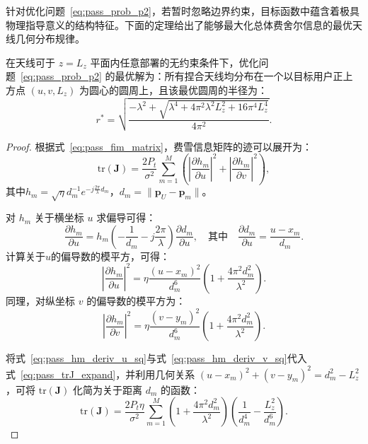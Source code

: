 针对优化问题~\eqref{eq:pass_prob_p2}，若暂时忽略边界约束，目标函数中蕴含着极具物理指导意义的结构特征。下面的定理给出了能够最大化总体费舍尔信息的最优天线几何分布规律。

\begin{theorem}\label{the:pass_optimal_geometry}
	在天线可于 $z = L_z$ 平面内任意部署的无约束条件下，优化问题~\eqref{eq:pass_prob_p2} 的最优解为：所有捏合天线均分布在一个以目标用户正上方点 $(u, v, L_z)$ 为圆心的圆周上，且该最优圆周的半径为：
	\begin{equation}\label{eq:pass_optimal_radius}
		r^\ast = \sqrt{
			\frac{
				- \lambda^2 
				+ \sqrt{ \lambda^4 + 4\pi^2 \lambda^2 L_z^2 + 16\pi^4 L_z^4 }
			}{
				4\pi^2
		}}.
	\end{equation}
\end{theorem}

\begin{proof}
	根据式~\eqref{eq:pass_fim_matrix}，费雪信息矩阵的迹可以展开为：
	\begin{equation}\label{eq:pass_trJ_expand}
		\mathrm{tr}(\bm{J}) = \frac{2P_t}{\sigma^2} \sum_{m=1}^{M} \left( \left| \frac{\partial h_m}{\partial u} \right|^2 + \left| \frac{\partial h_m}{\partial v} \right|^2 \right),
	\end{equation}
	其中$h_m = \sqrt{\eta} d_m^{-1} e^{-j\frac{2\pi}{\lambda} d_m}$，$d_m = \|\bm{p}_U - \bm{p}_m\|$。
	
	对 $h_m$ 关于横坐标 $u$ 求偏导可得：
	\begin{equation}\label{eq:pass_hm_deriv_u}
		\frac{\partial h_m}{\partial u} = h_m \left( -\frac{1}{d_m} - j \frac{2\pi}{\lambda} \right) \frac{\partial d_m}{\partial u}, \quad \text{其中} \quad \frac{\partial d_m}{\partial u} = \frac{u - x_m}{d_m}.
	\end{equation}
	计算关于$u$的偏导数的模平方，可得：
	\begin{equation}\label{eq:pass_hm_deriv_u_sq}
		\left| \frac{\partial h_m}{\partial u} \right|^2 = \eta \frac{(u-x_m)^2}{d_m^6} \left(1 + \frac{4\pi^2 d_m^2}{\lambda^2}\right).
	\end{equation}
	同理，对纵坐标 $v$ 的偏导数的模平方为：
	\begin{equation}\label{eq:pass_hm_deriv_v_sq}
		\left| \frac{\partial h_m}{\partial v} \right|^2 = \eta \frac{(v-y_m)^2}{d_m^6} \left(1 + \frac{4\pi^2 d_m^2}{\lambda^2}\right).
	\end{equation}
	
	将式~\eqref{eq:pass_hm_deriv_u_sq}与式~\eqref{eq:pass_hm_deriv_v_sq}代入式~\eqref{eq:pass_trJ_expand}，并利用几何关系 $(u-x_m)^2 + (v-y_m)^2 = d_m^2 - L_z^2$，可将 $\mathrm{tr}(\bm{J})$ 化简为关于距离 $d_m$ 的函数：
	\begin{equation}\label{eq:pass_trJ_final}
		\mathrm{tr}(\bm{J}) = \frac{2P_t \eta}{\sigma^2} \sum_{m=1}^M \left(1 + \frac{4\pi^2 d_m^2}{\lambda^2}\right) \left(\frac{1}{d_m^4} - \frac{L_z^2}{d_m^6}\right).
	\end{equation}
	

\end{proof}
